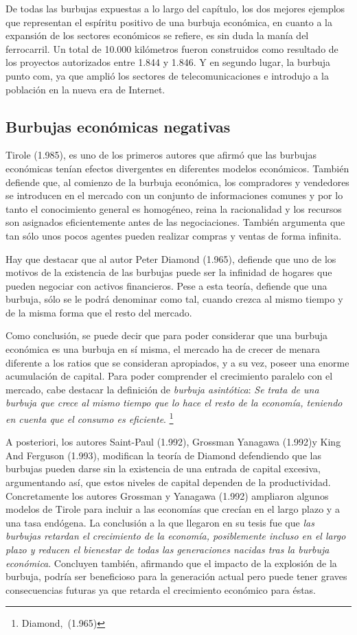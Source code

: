 De todas las burbujas expuestas a lo largo del capítulo, los dos mejores ejemplos que representan el espíritu positivo de una burbuja económica, en cuanto a la expansión de los sectores económicos se refiere, es sin duda la manía del ferrocarril. Un total de 10.000 kilómetros fueron construidos como resultado de los proyectos autorizados entre 1.844 y 1.846. Y en segundo lugar, la burbuja punto com, ya que amplió los sectores de telecomunicaciones e introdujo a la población en la nueva era de Internet. 

\subsection{Burbujas económicas negativas}

Tirole (1.985), es uno de los primeros autores que afirmó que las burbujas económicas tenían efectos divergentes en diferentes modelos económicos. También defiende que, al comienzo de la burbuja económica, los compradores y vendedores se introducen en el mercado con un conjunto de informaciones comunes y por lo tanto el conocimiento general es homogéneo, reina la racionalidad y los recursos son asignados eficientemente antes de las negociaciones. También argumenta que tan sólo unos pocos agentes pueden realizar compras y ventas de forma infinita.

Hay que destacar que al autor Peter Diamond (1.965), defiende que uno de los motivos de la existencia de las burbujas puede ser la infinidad de hogares que pueden negociar con activos financieros. Pese a esta teoría, defiende que una burbuja, sólo se le podrá denominar como tal, cuando crezca al mismo tiempo y de la misma forma que el resto del mercado. 

Como conclusión, se puede decir que para poder considerar que una burbuja económica es una burbuja en sí misma, el mercado ha de crecer de menara diferente a los ratios que se consideran apropiados, y a su vez, poseer una enorme acumulación de capital. Para poder comprender el crecimiento paralelo con el mercado, cabe destacar la definición de \emph{burbuja asintótica}: \emph{Se trata de una burbuja que crece al mismo tiempo que lo hace el resto de la economía, teniendo en cuenta que el consumo es eficiente}.	\footnote{Diamond, (1.965)}

A posteriori, los autores Saint-Paul (1.992), Grossman Yanagawa (1.992)y King And Ferguson (1.993), modifican la teoría de Diamond defendiendo que las burbujas pueden darse sin la existencia de una entrada de capital excesiva, argumentando así, que estos niveles de capital dependen de la productividad. Concretamente los autores Grossman y Yanagawa (1.992) ampliaron algunos modelos de Tirole para incluir a las economías que crecían en el largo plazo y a una tasa endógena. La conclusión a la que llegaron en su tesis fue que \emph{las burbujas retardan el crecimiento de la economía, posiblemente incluso en el largo plazo y reducen el bienestar de todas las generaciones nacidas tras la burbuja económica}. Concluyen también, afirmando que el impacto de la explosión de la burbuja, podría ser beneficioso para la generación actual pero puede tener graves consecuencias futuras ya que retarda el crecimiento económico para éstas.


